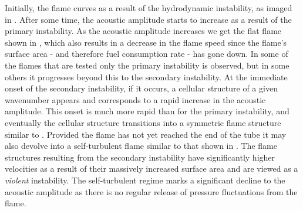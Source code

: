 Initially, the flame curves as a result of the hydrodynamic instability, as imaged in . After some time, the acoustic amplitude starts to increase as a result of the primary instability. As the acoustic amplitude increases we get the flat flame shown in , which also results in a decrease in the flame speed since the flame's surface area - and therefore fuel consumption rate - has gone down. In some of the flames that are tested only the primary instability is observed, but in some others it progresses beyond this to the secondary instability. At the immediate onset of the secondary instability, if it occurs, a cellular structure of a given wavenumber appears and corresponds to a rapid increase in the acoustic amplitude. This onset is much more rapid than for the primary instability, and eventually the cellular structure transitions into a symmetric flame structure similar to . Provided the flame has not yet reached the end of the tube it may also devolve into a self-turbulent flame similar to that shown in . The flame structures resulting from the secondary instability have significantly higher velocities as a result of their massively increased surface area and are viewed as a \emph{violent} instability. The self-turbulent regime marks a significant decline to the acoustic amplitude as there is no regular release of pressure fluctuations from the flame.


